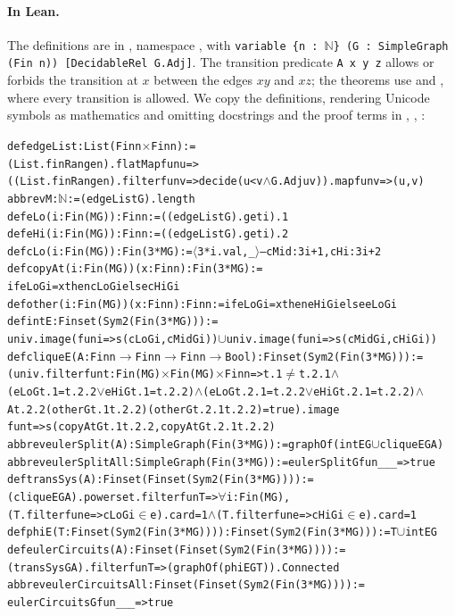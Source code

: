 \documentclass[10pt]{amsart}
\theoremstyle{plain}
\theoremstyle{definition}
\theoremstyle{remark}
\numberwithin{equation}{section}
\begin{document}
\paragraph{In Lean.} The definitions are in , namespace
, with \texttt{variable \{n : $\mathbb{N}$\} (G : SimpleGraph (Fin
n)) [DecidableRel G.Adj]}. The transition predicate \texttt{A x y z} allows or forbids the
transition at $x$ between the edges $xy$ and $xz$; the theorems use  and
, where every transition is allowed. We copy the definitions, rendering Unicode
symbols as mathematics and omitting docstrings and the proof terms in , ,
:
\begin{alltt}\small
def edgeList : List (Fin n \(\times\) Fin n) :=
  (List.finRange n).flatMap fun u =>
    ((List.finRange n).filter fun v => decide (u < v \(\wedge\) G.Adj u v)).map fun v => (u, v)
abbrev M : \(\mathbb{N}\) := (edgeList G).length
def eLo (i : Fin (M G)) : Fin n := ((edgeList G).get i).1
def eHi (i : Fin (M G)) : Fin n := ((edgeList G).get i).2
def cLo (i : Fin (M G)) : Fin (3 * M G) := \(\langle\)3 * i.val, _\(\rangle\)      -- cMid: 3i+1, cHi: 3i+2
def copyAt (i : Fin (M G)) (x : Fin n) : Fin (3 * M G) :=
  if eLo G i = x then cLo G i else cHi G i
def other (i : Fin (M G)) (x : Fin n) : Fin n := if eLo G i = x then eHi G i else eLo G i
def intE : Finset (Sym2 (Fin (3 * M G))) :=
  univ.image (fun i => s(cLo G i, cMid G i)) \(\cup\) univ.image (fun i => s(cMid G i, cHi G i))
def cliqueE (A : Fin n \(\to\) Fin n \(\to\) Fin n \(\to\) Bool) : Finset (Sym2 (Fin (3 * M G))) :=
  (univ.filter fun t : Fin (M G) \(\times\) Fin (M G) \(\times\) Fin n => t.1 \(\ne\) t.2.1 \(\wedge\)
      (eLo G t.1 = t.2.2 \(\vee\) eHi G t.1 = t.2.2) \(\wedge\) (eLo G t.2.1 = t.2.2 \(\vee\) eHi G t.2.1 = t.2.2) \(\wedge\)
      A t.2.2 (other G t.1 t.2.2) (other G t.2.1 t.2.2) = true).image
    fun t => s(copyAt G t.1 t.2.2, copyAt G t.2.1 t.2.2)
abbrev eulerSplit (A) : SimpleGraph (Fin (3 * M G)) := graphOf (intE G \(\cup\) cliqueE G A)
abbrev eulerSplitAll : SimpleGraph (Fin (3 * M G)) := eulerSplit G fun _ _ _ => true
def transSys (A) : Finset (Finset (Sym2 (Fin (3 * M G)))) :=
  (cliqueE G A).powerset.filter fun T => \(\forall\) i : Fin (M G),
    (T.filter fun e => cLo G i \(\in\) e).card = 1 \(\wedge\) (T.filter fun e => cHi G i \(\in\) e).card = 1
def phiE (T : Finset (Sym2 (Fin (3 * M G)))) : Finset (Sym2 (Fin (3 * M G))) := T \(\cup\) intE G
def eulerCircuits (A) : Finset (Finset (Sym2 (Fin (3 * M G)))) :=
  (transSys G A).filter fun T => (graphOf (phiE G T)).Connected
abbrev eulerCircuitsAll : Finset (Finset (Sym2 (Fin (3 * M G)))) :=
  eulerCircuits G fun _ _ _ => true
\end{alltt}
\end{document}
